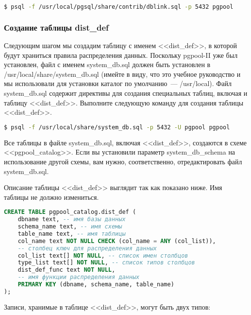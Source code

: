 \begin{lstlisting}[language=Bash,label=lst:pgpool29,caption=Установка dblink]
$ psql -f /usr/local/pgsql/share/contrib/dblink.sql -p 5432 pgpool
\end{lstlisting}

\subsubsection{Создание таблицы dist\_def}

Следующим шагом мы создадим таблицу с именем <<dist\_def>>, в которой будут храниться правила распределения данных. Поскольку pgpool-II уже был установлен, файл с именем system\_db.sql должен быть установлен в /usr/local/share/system\_db.sql (имейте в виду, что это учебное руководство и мы использовали для установки каталог по умолчанию~--- /usr/local). Файл system\_db.sql содержит директивы для создания специальных таблиц, включая и таблицу <<dist\_def>>. Выполните следующую команду для создания таблицы <<dist\_def>>.

\begin{lstlisting}[language=Bash,label=lst:pgpool30,caption=Создание таблицы dist\_def]
$ psql -f /usr/local/share/system_db.sql -p 5432 -U pgpool pgpool
\end{lstlisting}

Все таблицы в файле system\_db.sql, включая <<dist\_def>>, создаются в схеме <<pgpool\_catalog>>. Если вы установили параметр system\_db\_schema на использование другой схемы, вам нужно, соответственно, отредактировать файл system\_db.sql.

Описание таблицы <<dist\_def>> выглядит так как показано ниже. Имя таблицы не должно измениться.

\begin{lstlisting}[language=SQL,label=lst:pgpool31,caption=Создание таблицы dist\_def]
CREATE TABLE pgpool_catalog.dist_def (
    dbname text, -- имя базы данных
    schema_name text, -- имя схемы
    table_name text, -- имя таблицы
    col_name text NOT NULL CHECK (col_name = ANY (col_list)),
    -- столбец ключ для распределения данных
    col_list text[] NOT NULL, -- список имен столбцов
    type_list text[] NOT NULL, -- список типов столбцов
    dist_def_func text NOT NULL,
    -- имя функции распределения данных
    PRIMARY KEY (dbname, schema_name, table_name)
);
\end{lstlisting}

Записи, хранимые в таблице <<dist\_def>>, могут быть двух типов:

